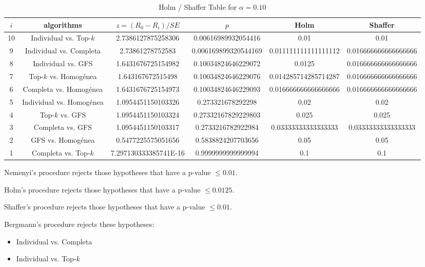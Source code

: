 \documentclass[a4paper,10pt]{article}
\begin{document}
\begin{landscape}
\begin{table}[!htp]
\centering\tiny
\caption{Holm / Shaffer Table for $\alpha=0.10$}
\begin{tabular}{cccccc}
$i$&algorithms&$z=(R_0 - R_i)/SE$&$p$&Holm&Shaffer\\
\hline
10&Individual vs. Top-$k$&2.7386127875258306&0.00616989932054416&0.01&0.01\\
9&Individual vs. Completa&2.73861278752583&0.006169899320544169&0.011111111111111112&0.016666666666666666\\
8&Individual vs. GFS&1.6431676725154982&0.10034824646229072&0.0125&0.016666666666666666\\
7&Top-$k$ vs. Homogénea&1.643167672515498&0.10034824646229076&0.014285714285714287&0.016666666666666666\\
6&Completa vs. Homogénea&1.6431676725154973&0.10034824646229093&0.016666666666666666&0.016666666666666666\\
5&Individual vs. Homogénea&1.0954451150103326&0.273321678292298&0.02&0.02\\
4&Top-$k$ vs. GFS&1.0954451150103324&0.27332167829229803&0.025&0.025\\
3&Completa vs. GFS&1.0954451150103317&0.2733216782922984&0.03333333333333333&0.03333333333333333\\
2&GFS vs. Homogénea&0.5477225575051656&0.5838824207703656&0.05&0.05\\
1&Completa vs. Top-$k$&7.297130333385741E-16&0.9999999999999994&0.1&0.1\\
\hline
\end{tabular}
\end{table}
Nemenyi's procedure rejects those hypotheses that have a p-value $\le0.01$.


Holm's procedure rejects those hypotheses that have a p-value $\le0.0125$.


Shaffer's procedure rejects those hypotheses that have a p-value $\le0.01$.


Bergmann's procedure rejects these hypotheses:


\begin{itemize}


\item Individual vs. Completa
\item Individual vs. Top-$k$
\end{itemize}



\end{landscape}
\end{document}
